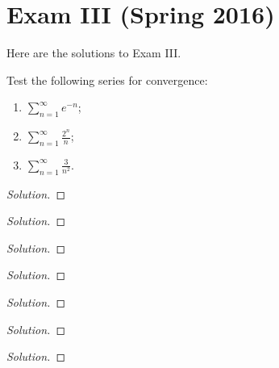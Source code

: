\chapter{Exam III (Spring 2016)}
Here are the solutions to Exam III.

\begin{problem}
Test the following series for convergence:
\begin{enumerate}[label=(\MakeUppercase{\roman*})]
\item $\displaystyle\sum_{n=1}^\infty e^{-n}$;
\item $\displaystyle\sum_{n=1}^\infty\frac{2^n}{n}$;
\item $\displaystyle\sum_{n=1}^\infty\frac{3}{n^2}$.
\end{enumerate}
\end{problem}
\begin{proof}[Solution]
\end{proof}

\begin{problem}
\end{problem}
\begin{proof}[Solution]
\end{proof}

\begin{problem}
\end{problem}
\begin{proof}[Solution]
\end{proof}

\begin{problem}
\end{problem}
\begin{proof}[Solution]
\end{proof}

\begin{problem}
\end{problem}
\begin{proof}[Solution]
\end{proof}

\begin{problem}
\end{problem}
\begin{proof}[Solution]
\end{proof}

\begin{problem}
\end{problem}
\begin{proof}[Solution]
\end{proof}

